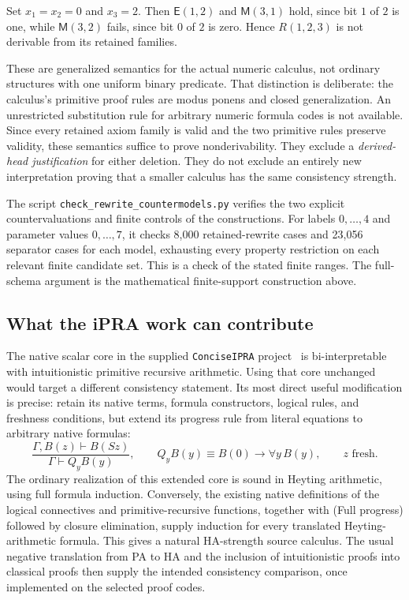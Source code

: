 Set $x_1=x_2=0$ and $x_3=2$.  Then $\mathsf E(1,2)$ and
$\mathsf M(3,1)$ hold, since bit $1$ of $2$ is one, while
$\mathsf M(3,2)$ fails, since bit $0$ of $2$ is zero.  Hence $R(1,2,3)$
is not derivable from its retained families.

These are generalized semantics for the actual numeric calculus, not
ordinary structures with one uniform binary predicate.  That distinction
is deliberate: the calculus's primitive proof rules are modus ponens
and closed generalization.  An unrestricted substitution rule for
arbitrary numeric formula codes is not available.  Since every retained
axiom family is valid and the two primitive rules preserve validity,
these semantics suffice to prove nonderivability.  They exclude a
\emph{derived-head justification} for either deletion.  They do not
exclude an entirely new interpretation proving that a smaller calculus
has the same consistency strength.

The script \texttt{check\_rewrite\_countermodels.py} verifies the two
explicit countervaluations and finite controls of the constructions.
For labels $0,\ldots,4$ and parameter values $0,\ldots,7$, it checks
8,000 retained-rewrite cases and 23,056 separator cases for each model,
exhausting every property restriction on each relevant finite candidate
set.  This is a check of the stated finite ranges.  The full-schema
argument is the mathematical finite-support construction above.

\subsection{What the iPRA work can contribute}

The native scalar core in the supplied \texttt{ConciseIPRA} project~\cite{ipra} is
bi-interpretable with intuitionistic primitive recursive arithmetic.
Using that core unchanged would target a different consistency
statement.  Its most direct useful modification is precise: retain its
native terms, formula constructors, logical rules, and freshness
conditions, but extend its progress rule from literal equations to
arbitrary native formulas:
\[
 \frac{\Gamma,B(z)\vdash B(Sz)}
      {\Gamma\vdash Q_y B(y)},
 \qquad
 Q_y B(y)\equiv B(0)\to\forall y\,B(y),
 \qquad z\text{ fresh}.
 \tag{Full progress}
\]
The ordinary realization of this extended core is sound in Heyting
arithmetic, using full formula induction.  Conversely, the existing
native definitions of the logical connectives and primitive-recursive
functions, together with \textup{(Full progress)} followed by closure
elimination, supply induction for every translated Heyting-arithmetic
formula.  This gives a natural HA-strength source calculus.  The usual
negative translation from PA to HA and the inclusion of intuitionistic
proofs into classical proofs then supply the intended consistency
comparison, once implemented on the selected proof codes.

